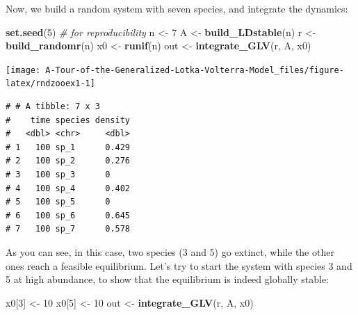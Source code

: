 \documentclass[]{book}
\newenvironment{Shaded}{\begin{snugshade}}{\end{snugshade}}
\newcommand{\CommentTok}[1]{\textcolor[rgb]{0.56,0.35,0.01}{\textit{#1}}}
\newcommand{\DataTypeTok}[1]{\textcolor[rgb]{0.13,0.29,0.53}{#1}}
\newcommand{\DecValTok}[1]{\textcolor[rgb]{0.00,0.00,0.81}{#1}}
\newcommand{\KeywordTok}[1]{\textcolor[rgb]{0.13,0.29,0.53}{\textbf{#1}}}
\newcommand{\NormalTok}[1]{#1}
\newcommand{\OperatorTok}[1]{\textcolor[rgb]{0.81,0.36,0.00}{\textbf{#1}}}
\newcommand{\StringTok}[1]{\textcolor[rgb]{0.31,0.60,0.02}{#1}}
\begin{document}
Now, we build a random system with seven species, and integrate the dynamics:

\begin{Shaded}
\begin{Highlighting}[]
\KeywordTok{set.seed}\NormalTok{(}\DecValTok{5}\NormalTok{) }\CommentTok{# for reproducibility}
\NormalTok{n <-}\StringTok{ }\DecValTok{7}
\NormalTok{A <-}\StringTok{ }\KeywordTok{build_LDstable}\NormalTok{(n)}
\NormalTok{r <-}\StringTok{ }\KeywordTok{build_randomr}\NormalTok{(n)}
\NormalTok{x0 <-}\StringTok{ }\KeywordTok{runif}\NormalTok{(n)}
\NormalTok{out <-}\StringTok{ }\KeywordTok{integrate_GLV}\NormalTok{(r, A, x0)}
\end{Highlighting}
\end{Shaded}

\begin{center}\texttt{[image: A-Tour-of-the-Generalized-Lotka-Volterra-Model\_files/figure-latex/rndzooex1-1]} \end{center}

\begin{Shaded}
\end{Shaded}

\begin{verbatim}
# # A tibble: 7 x 3
#    time species density
#   <dbl> <chr>     <dbl>
# 1   100 sp_1      0.429
# 2   100 sp_2      0.276
# 3   100 sp_3      0    
# 4   100 sp_4      0.402
# 5   100 sp_5      0    
# 6   100 sp_6      0.645
# 7   100 sp_7      0.578
\end{verbatim}

As you can see, in this case, two species (3 and 5) go extinct, while the other ones reach a feasible equilibrium. Let's try to start the system with species 3 and 5 at high abundance, to show that the equilibrium is indeed globally stable:

\begin{Shaded}
\begin{Highlighting}[]
\NormalTok{x0[}\DecValTok{3}\NormalTok{] <-}\StringTok{ }\DecValTok{10}
\NormalTok{x0[}\DecValTok{5}\NormalTok{] <-}\StringTok{ }\DecValTok{10}
\NormalTok{out <-}\StringTok{ }\KeywordTok{integrate_GLV}\NormalTok{(r, A, x0)}
\end{Highlighting}
\end{Shaded}
\end{document}
